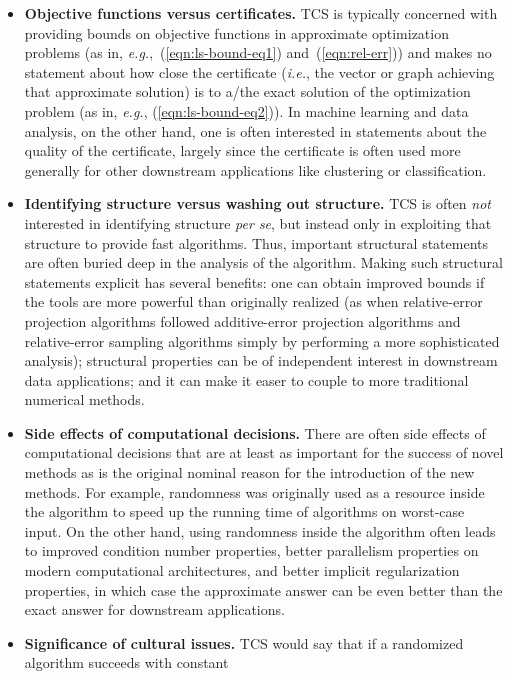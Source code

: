 \documentclass[twoside]{article}
\begin{document}
\begin{itemize}
\item
\textbf{Objective functions versus certificates.}
TCS is typically concerned with providing bounds on objective functions in 
approximate optimization problems (as in,
\emph{e.g.},~(\ref{eqn:ls-bound-eq1}) and~(\ref{eqn:rel-err})) and makes no 
statement about how close the certificate (\emph{i.e.}, the vector or graph 
achieving that approximate solution) is to a/the exact solution of
the optimization problem (as in, \emph{e.g.}, (\ref{eqn:ls-bound-eq2})).
In machine learning and data analysis, on the other hand, one is often 
interested in statements about the quality of the certificate, largely since 
the certificate is often used more generally for other downstream 
applications like clustering or classification.
\item
\textbf{Identifying structure versus washing out structure.}
TCS is often \emph{not} interested in identifying structure \emph{per se}, 
but instead only in exploiting that structure to provide fast algorithms.
Thus, important structural statements are often buried deep in the analysis
of the algorithm.
Making such structural statements explicit has several benefits:
one can obtain improved bounds if the tools are more powerful than 
originally realized (as when relative-error projection algorithms followed 
additive-error projection algorithms and relative-error sampling algorithms 
simply by performing a more sophisticated analysis); structural properties 
can be of independent interest in downstream data applications; and it can 
make it easer to couple to more traditional numerical methods.
\item
\textbf{Side effects of computational decisions.}
There are often side effects of computational decisions that are at least
as important for the success of novel methods as is the original nominal 
reason for the introduction of the new methods.
For example, randomness was originally used as a resource inside the 
algorithm to speed up the running time of algorithms on worst-case 
input.
On the other hand, using randomness inside the algorithm often leads to 
improved condition number properties, better parallelism properties on 
modern computational architectures, and better implicit regularization
properties, in which case the approximate answer can be even better than the
exact answer for downstream applications.
\item
\textbf{Significance of cultural issues.}
TCS would say that if a randomized algorithm succeeds with constant 

\end{itemize}
\end{document}
